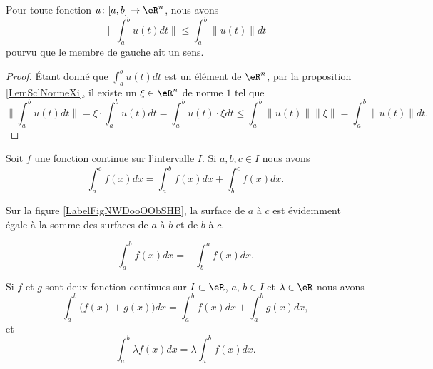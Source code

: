 \begin{lemma}			\label{LemIneqnormeintintnorm}
	Pour toute fonction $u\colon \mathopen[ a , b \mathclose]\to \eR^n$, nous avons
	\begin{equation}
		\| \int_a^bu(t)dt\|\leq\int_a^b\| u(t) \|dt
	\end{equation}
	pourvu que le membre de gauche ait un sens.
\end{lemma}

\begin{proof}
	Étant donné que $\int_a^bu(t)dt$ est un élément de $\eR^n$, par la proposition \ref{LemSclNormeXi}, il existe un $\xi\in\eR^n$ de norme $1$ tel que
	\begin{equation}
		\| \int_a^bu(t)dt \|=\xi\cdot\int_a^b u(t)dt=\int_a^b u(t)\cdot\xi dt\leq\int_a^b\| u(t) \|   \| \xi \|=\int_a^b\| u(t) \|dt.
	\end{equation}
\end{proof}


\begin{proposition}
    Soit  \( f\) une fonction continue sur l'intervalle \( I\). Si \( a,b,c\in I\) nous avons
    \begin{equation}
        \int_a^cf(x)dx=\int_a^bf(x)dx+\int_b^cf(x)dx.
    \end{equation}
\end{proposition}

Sur la figure \ref{LabelFigNWDooOObSHB}, la surface de \( a\) à \( c\) est évidemment égale à la somme des surfaces de \( a\) à \( b\) et de \( b\) à \( c\).
\newcommand{\CaptionFigNWDooOObSHB}{Illustration pour les relations de Chasles.}


\begin{corollary}
  \begin{equation}
        \int_a^bf(x)dx=-\int_b^af(x)dx.
    \end{equation}
\end{corollary}

\begin{proposition}\label{lineariteintegrale}
    Si $f$ et $g$ sont deux fonction continues sur $I\subset\eR$, $a, \, b\in I$ et \( \lambda\in \eR\) nous avons
    \begin{equation}
        \int_a^b\big( f(x)+g(x) \big)dx=\int_a^bf(x)dx+\int_a^bg(x)dx,
    \end{equation}
    et
    \begin{equation}
        \int_a^b \lambda f(x)dx=\lambda\int_a^bf(x)dx.
    \end{equation}
\end{proposition}

